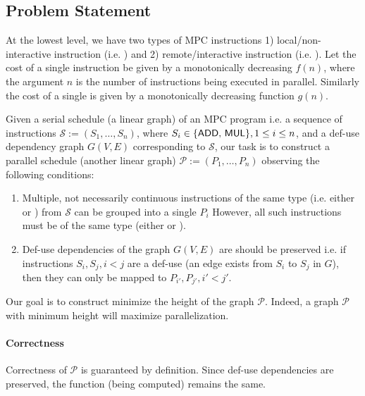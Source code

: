 \subsection{Problem Statement}
\label{sec:problem}



At the lowest level, we have two types of MPC instructions 1) local/non-interactive instruction (i.e. \add) and 2) remote/interactive instruction (i.e. \mul). Let the cost of a single \add instruction be given by a monotonically decreasing $f(n)$, where the argument $n$ is the number of \add instructions being executed in parallel. Similarly the cost of a single \mul is given by a monotonically decreasing function $g(n)$.

Given a serial schedule (a linear graph) of an MPC program i.e. a sequence of instructions $\mathcal{S}:=(S_1, \dots, S_n)$, where $S_i \in \{\text{{\sf ADD}, {\sf MUL}}\}, 1 \leq i \leq n$, and a def-use dependency graph $G(V, E)$ corresponding to $\mathcal{S}$, our task is to construct a parallel schedule (another linear graph) $\mathcal{P} := (P_1, \dots, P_n)$ observing the following conditions:

\begin{enumerate}
    \item Multiple, not necessarily continuous instructions of the same type (i.e. either \add or \mul) from $\mathcal{S}$ can be grouped into a single $P_i$  However, all such instructions must be of the same type (either \add or \mul).
    \item Def-use dependencies of the graph $G(V, E)$ are should be preserved i.e. if instructions $S_i, S_j, i < j$ are a def-use (an edge exists from $S_i$ to $S_j$ in $G$), then they can only be mapped to $P_{i'}, P_{j'}, i' < j'$.
\end{enumerate}

Our goal is to construct minimize the height of the graph $\mathcal{P}$. Indeed, a graph $\mathcal{P}$ with minimum height will maximize parallelization.

\paragraph{Correctness} Correctness of $\mathcal{P}$ is guaranteed by definition. Since def-use dependencies are preserved, the function (being computed) remains the same.

